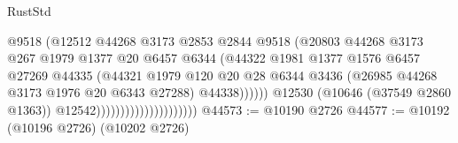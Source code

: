 \begin{lexlean}{RustStd}
\begin{coremodule}
                                                  @9518
                                                  (@12512
                                                    @44268
                                                    @3173
                                                    @2853
                                                    @2844
                                                    @9518
                                                    (@20803
                                                      @44268
                                                      @3173
                                                      @267
                                                      @1979
                                                      @1377
                                                      @20
                                                      @6457
                                                      @6344
                                                      (@44322
                                                        @1981
                                                        @1377
                                                        @1576
                                                        @6457
                                                        @27269
                                                        @44335
                                                        (@44321
                                                          @1979
                                                          @120
                                                          @20
                                                          @28
                                                          @6344
                                                          @3436
                                                          (@26985
                                                            @44268
                                                            @3173
                                                            @1976
                                                            @20
                                                            @6343
                                                            @27288)
                                                          @44338))))))
                                              @12530
                                              (@10646 (@37549 @2860 @1363))
                                              @12542)))))))))))))))))))))
@44573 := @10190 @2726
@44577 := @10192 (@10196 @2726) (@10202 @2726)

\end{coremodule}
\end{lexlean}
